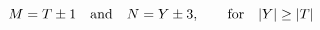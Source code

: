 \begin{equation}
M=T\pm 1 \quad\hbox{and}\quad  N=Y\pm 3, \qquad\hbox{for}\quad |Y|\ge |T|
\end{equation}

